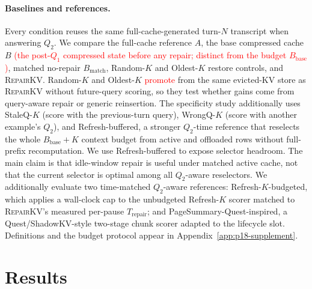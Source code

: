 \documentclass{article}
\newcommand{\repairkv}{\textsc{RepairKV}}
\newcommand{\bbase}{\ensuremath{B_{\mathrm{base}}}}
\newcommand{\bmatch}{\ensuremath{B_{\mathrm{match}}}}
\begin{document}
\paragraph{Baselines and references.}
Every condition reuses the same full-cache-generated turn-$N$
transcript when answering $Q_2$.
We compare the full-cache reference $A$, the base compressed cache $B$
\textcolor{red}{(the post-$Q_1$ compressed state before any repair;
distinct from the budget $\bbase$)}, matched no-repair $\bmatch$,
Random-$K$ and Oldest-$K$ restore controls, and \repairkv{}.
Random-$K$ and Oldest-$K$ \textcolor{red}{promote} from the same evicted-KV store as
\repairkv{} without future-query scoring, so they test whether gains come
from query-aware repair or generic reinsertion.
The specificity study additionally uses StaleQ-$K$ (score with the
previous-turn query), WrongQ-$K$ (score with another example's $Q_2$),
and Refresh-buffered, a stronger $Q_2$-time reference that reselects the
whole $\bbase+K$ context budget from active and offloaded rows without
full-prefix recomputation.
We use Refresh-buffered to expose selector headroom.
The main claim is that idle-window repair is useful under matched active
cache, not that the current selector is optimal among all $Q_2$-aware
reselectors.
\textcolor{green!50!black}{We additionally evaluate two time-matched $Q_2$-aware references: Refresh-$K$-budgeted, which applies a wall-clock cap to the unbudgeted Refresh-$K$ scorer matched to \repairkv{}'s measured per-pause $T_\text{repair}$; and PageSummary-Quest-inspired, a Quest/ShadowKV-style two-stage chunk scorer adapted to the lifecycle slot. Definitions and the budget protocol appear in Appendix~\ref{app:p18-supplement}.}

\section{Results}
\label{sec:results}
\end{document}
